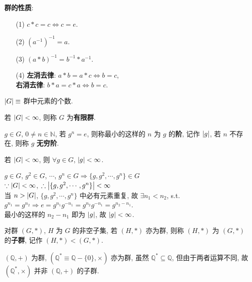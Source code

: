 \documentclass{note}
\begin{document}
\textbf{群的性质}:
\begin{itemize}
    \item[(1)] $c*c=c\Longleftrightarrow c=e$.
    \item[(2)] $(a^{-1})^{-1}=a$.
    \item[(3)] $(a*b)^{-1}=b^{-1}*a^{-1}$.
    \item[(4)] \textbf{左消去律}: $a*b=a*c\Longleftrightarrow b=c$,\\
    \textbf{右消去律}: $b*a=c*a\Longleftrightarrow b=c$.
\end{itemize}

\begin{df}[群的阶]
    $\left\lvert G\right\rvert\equiv$ 群中元素的个数.
\end{df}

\begin{df}[有限群]
    若 $\left\lvert G\right\rvert<\infty$, 则称 $G$ 为\textbf{有限群}.
\end{df}

\begin{df}[群元素的阶]
    $g\in G$, $0\neq n\in\mathbb{N}$, 若 $g^n=e$, 则称最小的这样的 $n$ 为 $g$ 的\textbf{阶}, 记作 $\left\lvert g\right\rvert$, 若 $n$ 不存在, 则称 $g$ \textbf{无穷阶}.
\end{df}

若 $\left\lvert G\right\rvert<\infty$, 则 $\forall g\in G$, $\left\lvert g\right\rvert<\infty$.
\begin{pf}
    $g\in G$, $g^2\in G$, $\cdots$, $g^n\in G\Longrightarrow\{g,g^2,\cdots,g^n\}\in G$\\
    $\because\left\lvert G\right\rvert<\infty$, $\therefore\left\lvert\{g,g^2,\cdots,g^n\}\right\rvert<\infty$\\
    当 $n>\left\lvert G\right\rvert$, $\{g,g^2,\cdots,g^n\}$ 中必有元素重复, 故 $\exists n_1<n_2$, s.t. $g^{n_1}=g^{n_2}\Longrightarrow e=g^{n_1}g^{-n_1}=g^{n_2}g^{-n_1}=g^{n_2-n_1}$.\\
    最小的这样的 $n_2-n_1$ 即为 $\left\lvert g\right\rvert$, 故 $\left\lvert g\right\rvert<\infty$.
\end{pf}

\begin{df}[子群]
    对群 $(G,*)$, $H$ 为 $G$ 的非空子集, 若 $(H,*)$ 亦为群, 则称 $(H,*)$ 为 $(G,*)$ 的\textbf{子群}, 记作 $(H,*)<(G,*)$.
\end{df}

\begin{eg}
    $(\mathbb{Q},+)$ 为群, $(\mathbb{Q}^*\equiv\mathbb{Q}-\{0\},\times)$ 亦为群, 虽然 $\mathbb{Q}^*\subseteq\mathbb{Q}$, 但由于两者运算不同, 故 $(\mathbb{Q}^*,\times)$ 并非 $(\mathbb{Q},+)$ 的子群.
\end{eg}
\end{document}
